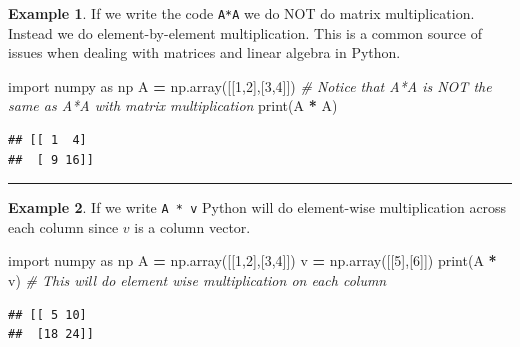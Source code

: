 \documentclass[
]{book}
\newenvironment{Shaded}{\begin{snugshade}}{\end{snugshade}}
\newcommand{\BuiltInTok}[1]{#1}
\newcommand{\CommentTok}[1]{\textcolor[rgb]{0.56,0.35,0.01}{\textit{#1}}}
\newcommand{\DecValTok}[1]{\textcolor[rgb]{0.00,0.00,0.81}{#1}}
\newcommand{\ImportTok}[1]{#1}
\newcommand{\NormalTok}[1]{#1}
\newcommand{\OperatorTok}[1]{\textcolor[rgb]{0.81,0.36,0.00}{\textbf{#1}}}
\theoremstyle{definition}
\theoremstyle{definition}
\newtheorem{example}{Example}[chapter]
\theoremstyle{definition}
\theoremstyle{remark}
\begin{document}
\begin{example}
\protect\hypertarget{exm:unnamed-chunk-723}{}{\label{exm:unnamed-chunk-723} }If we write the code \texttt{A*A} we do NOT do matrix multiplication. Instead we do element-by-element multiplication. This is a common source of issues when dealing with matrices and linear algebra in Python.
\end{example}

\begin{Shaded}
\begin{Highlighting}[]
\ImportTok{import}\NormalTok{ numpy }\ImportTok{as}\NormalTok{ np}
\NormalTok{A }\OperatorTok{=}\NormalTok{ np.array([[}\DecValTok{1}\NormalTok{,}\DecValTok{2}\NormalTok{],[}\DecValTok{3}\NormalTok{,}\DecValTok{4}\NormalTok{]])}
\CommentTok{\# Notice that A*A is NOT the same as A*A with matrix multiplication}
\BuiltInTok{print}\NormalTok{(A }\OperatorTok{*}\NormalTok{ A) }
\end{Highlighting}
\end{Shaded}

\begin{verbatim}
## [[ 1  4]
##  [ 9 16]]
\end{verbatim}

\begin{center}\rule{0.5\linewidth}{0.5pt}\end{center}

\begin{example}
\protect\hypertarget{exm:unnamed-chunk-725}{}{\label{exm:unnamed-chunk-725} }If we write \texttt{A\ *\ v} Python will do element-wise multiplication across each column since \(v\) is a column vector.
\end{example}

\begin{Shaded}
\begin{Highlighting}[]
\ImportTok{import}\NormalTok{ numpy }\ImportTok{as}\NormalTok{ np}
\NormalTok{A }\OperatorTok{=}\NormalTok{ np.array([[}\DecValTok{1}\NormalTok{,}\DecValTok{2}\NormalTok{],[}\DecValTok{3}\NormalTok{,}\DecValTok{4}\NormalTok{]])}
\NormalTok{v }\OperatorTok{=}\NormalTok{ np.array([[}\DecValTok{5}\NormalTok{],[}\DecValTok{6}\NormalTok{]])}
\BuiltInTok{print}\NormalTok{(A }\OperatorTok{*}\NormalTok{ v) }\CommentTok{\# This will do element wise multiplication on each column}
\end{Highlighting}
\end{Shaded}

\begin{verbatim}
## [[ 5 10]
##  [18 24]]
\end{verbatim}
\end{document}
